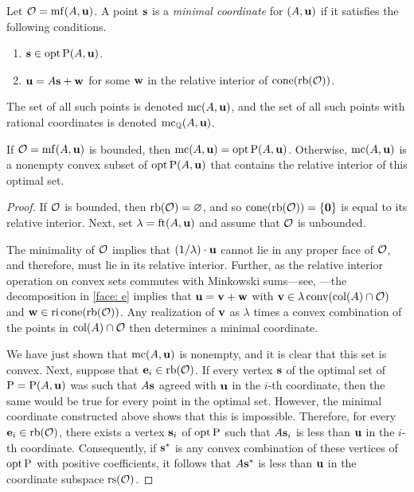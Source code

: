 \documentclass[11pt]{amsart}
\begin{document}
\begin{definition}
\label{mc: D} 
Let $\mathcal{O} = \operatorname{mf}(A, \mathbf{u})$.  A point $\mathbf{s}$ is a \emph{minimal coordinate} for $(A, \mathbf{u})$ if it satisfies the following conditions.
\begin{enumerate}
\item $\mathbf{s} \in \operatorname{opt} \mathrm{P}(A, \mathbf{u})$.
\item $\mathbf{u} = A \mathbf{s} + \mathbf{w}$ for some $\mathbf{w}$ in the relative interior of $\operatorname{cone} ( \operatorname{rb}(\mathcal{O}))$.  
\end{enumerate}

The set of all such points is denoted $\operatorname{mc}(A, \mathbf{u})$, and the set of all such points with rational coordinates is denoted $\operatorname{mc}_{\mathbb{Q}}(A, \mathbf{u})$.  
\end{definition}


\begin{proposition}  
\label{opt versus mc: P}  If $\mathcal{O} = \operatorname{mf}(A, \mathbf{u})$ is bounded, then $\operatorname{mc}(A, \mathbf{u}) = \operatorname{opt} \mathrm{P}(A, \mathbf{u})$.  Otherwise,  $\operatorname{mc}(A, \mathbf{u})$ is a nonempty convex subset of $\operatorname{opt} \mathrm{P}(A, \mathbf{u})$ that contains the relative interior of this optimal set. 
\end{proposition}

\begin{proof}    
If $\mathcal{O}$ is bounded, then $\operatorname{rb}(\mathcal{O}) = \varnothing$, and so $\operatorname{cone}( \operatorname{rb}(\mathcal{O})) = \{\mathbf{0} \}$ is equal to its relative interior.  Next, set $\lambda = \operatorname{ft}(A, \mathbf{u})$ and assume that $\mathcal{O}$ is unbounded.

 The minimality of $\mathcal{O}$ implies that $(1/\lambda)  \cdot \mathbf{u}$ cannot lie in any proper face of $\mathcal{O}$, and therefore, must lie in its relative interior.  Further, as the relative interior operation on convex sets commutes with Minkowski sums---see, \eg \cite[Theorem 4.10(b)]{van-tiel.convex-analysis}---the decomposition in \eqref{face: e}  implies that $\mathbf{u} = \mathbf{v} + \mathbf{w}$ with $\mathbf{v} \in \lambda \operatorname{conv}(\operatorname{col}(A) \cap \mathcal{O})$ and $\mathbf{w} \in \operatorname{ri} \operatorname{cone}(\operatorname{rb}(\mathcal{O}))$.  Any realization of $\mathbf{v}$ as $\lambda$ times a convex combination of the points in $\operatorname{col}(A) \cap \mathcal{O}$ then determines a minimal coordinate.

We have just shown that $\operatorname{mc}(A, \mathbf{u})$ is nonempty, and it is clear that this set is convex.  Next,  suppose that $\mathbf{e}_i \in \operatorname{rb}(\mathcal{O})$.  If every vertex $\mathbf{s}$ of the optimal set of $\mathrm{P} = \mathrm{P}(A, \mathbf{u})$ was such that $A \mathbf{s}$ agreed with $\mathbf{u}$ in the $i$-th coordinate, then the same would be true for every point in the optimal set.   However, the minimal coordinate constructed above shows that this is impossible.  Therefore, for every $\mathbf{e}_i \in \operatorname{rb}(\mathcal{O})$, there exists a vertex $\mathbf{s}_i$ of $\operatorname{opt} \mathrm{P}$ such that $A \mathbf{s}_i$ is less than $\mathbf{u}$ in the $i$-th coordinate.  Consequently, if $\mathbf{s}^{\ast}$ is any convex combination of these vertices of $\operatorname{opt} \mathrm{P}$ with positive coefficients, it follows that $A \mathbf{s}^{\ast}$ is less than $\mathbf{u}$ in the coordinate subspace $\operatorname{rs}(\mathcal{O})$.  
\end{proof}
\end{document}
